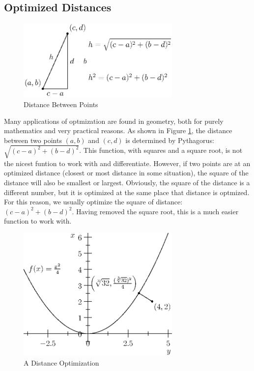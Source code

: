 \documentclass[fleqn]{report}
\begin{document}
\subsection{Optimized Distances}
\label{optmized-distances}

\begin{figure}[t]
\centering
\includegraphics[width=8cm]{figure65.eps}
\caption{Distance Between Points}
\label{figure-distance-between-points}
\end{figure}

Many applications of optmization are found in geometry, both
for purely mathematics and very practical reasons. As shown in
Figure \ref{figure-distance-between-points}, the distance between two
points $(a,b)$ and $(c,d)$ is determined by Pythagorus:
$\sqrt{(c-a)^2 + (b-d)^2}$. This function, with squares and a
square root, is not the nicest funtion to work with and
differentiate. However, if two points are at an optimized
distance (closest or most distance in some situation), the
square of the distance will also be smallest or largest.
Obviously, the square of the distance is a different number,
but it is optimized at the same place that distance is
optmized. For this reason, we usually optimize the square of
distance: $(c-a)^2 + (b-d)^2$. Having removed the square root,
this is a much easier function to work with.

\begin{figure}[t]
\centering
\includegraphics[width=8cm]{figure66.eps}
\caption{A Distance Optimization}
\label{figure-distance-optimization}
\end{figure}
\end{document}
